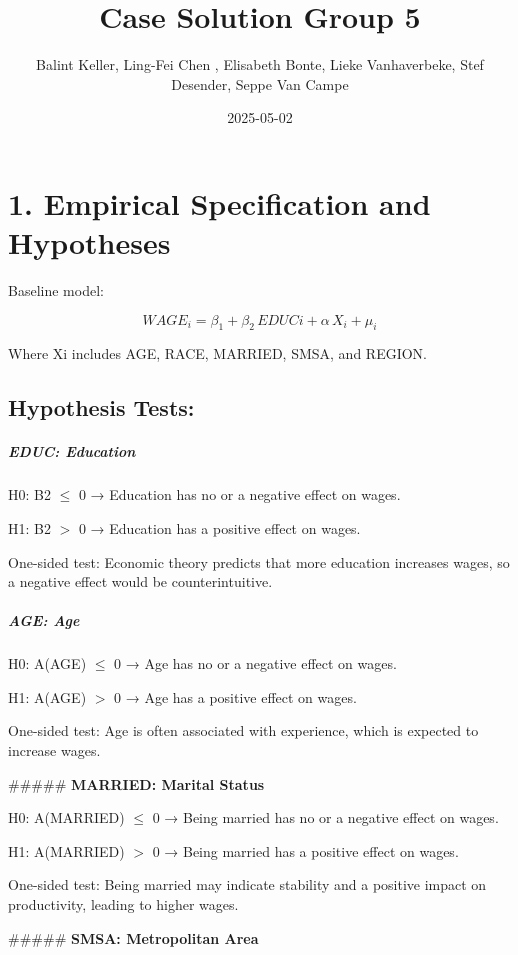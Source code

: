 \documentclass[
]{article}
\title{Case Solution Group 5}
\author{Balint Keller, Ling-Fei Chen , Elisabeth Bonte, Lieke
Vanhaverbeke, Stef Desender, Seppe Van Campe}
\date{2025-05-02}
\begin{document}
\maketitle

\section{\texorpdfstring{\textbf{1. Empirical Specification and
Hypotheses}}{1. Empirical Specification and Hypotheses}}\label{empirical-specification-and-hypotheses}

Baseline model:

\[WAGE_i = \beta_1 + \beta_2 \, EDUCi + \alpha \, X_i + \mu_i\]

Where Xi includes AGE, RACE, MARRIED, SMSA, and REGION.

\subsection{\texorpdfstring{\textbf{Hypothesis
Tests:}}{Hypothesis Tests:}}\label{hypothesis-tests}

\subparagraph{\texorpdfstring{\textbf{EDUC:
Education}}{EDUC: Education}}\label{educ-education}

H0: B2 \(\leq\) 0 → Education has no or a negative effect on wages.

H1: B2 \(>\) 0 → Education has a positive effect on wages.

One-sided test: Economic theory predicts that more education increases
wages, so a negative effect would be counterintuitive.

\subparagraph{\texorpdfstring{\textbf{AGE:
Age}}{AGE: Age}}\label{age-age}

H0: A(AGE) \(\leq\) 0 → Age has no or a negative effect on wages.

H1: A(AGE) \(>\) 0 → Age has a positive effect on wages.

One-sided test: Age is often associated with experience, which is
expected to increase wages.

\#\#\#\#\# \textbf{MARRIED: Marital Status}

H0: A(MARRIED) \(\leq\) 0 → Being married has no or a negative effect on
wages.

H1: A(MARRIED) \(>\) 0 → Being married has a positive effect on wages.

One-sided test: Being married may indicate stability and a positive
impact on productivity, leading to higher wages.

\#\#\#\#\# \textbf{SMSA: Metropolitan Area}
\end{document}
